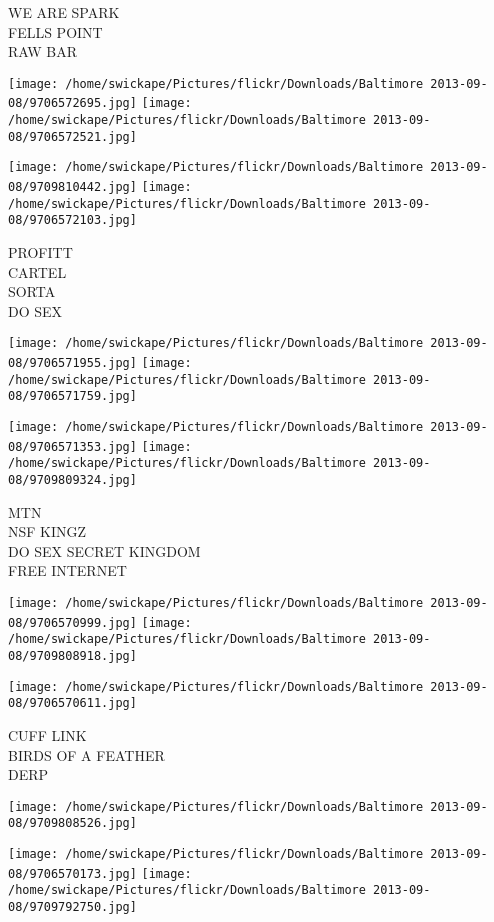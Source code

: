 \documentclass[10pt,letterpaper]{article}
\begin{document}
WE ARE SPARK\\
FELLS POINT\\
RAW BAR
\pagebreak

\texttt{[image: /home/swickape/Pictures/flickr/Downloads/Baltimore 2013-09-08/9706572695.jpg]}
\texttt{[image: /home/swickape/Pictures/flickr/Downloads/Baltimore 2013-09-08/9706572521.jpg]}

\texttt{[image: /home/swickape/Pictures/flickr/Downloads/Baltimore 2013-09-08/9709810442.jpg]}
\texttt{[image: /home/swickape/Pictures/flickr/Downloads/Baltimore 2013-09-08/9706572103.jpg]}

PROFITT\\
CARTEL\\
SORTA\\
DO SEX
\pagebreak

\texttt{[image: /home/swickape/Pictures/flickr/Downloads/Baltimore 2013-09-08/9706571955.jpg]}
\texttt{[image: /home/swickape/Pictures/flickr/Downloads/Baltimore 2013-09-08/9706571759.jpg]}

\texttt{[image: /home/swickape/Pictures/flickr/Downloads/Baltimore 2013-09-08/9706571353.jpg]}
\texttt{[image: /home/swickape/Pictures/flickr/Downloads/Baltimore 2013-09-08/9709809324.jpg]}

MTN\\
NSF KINGZ\\
DO SEX SECRET KINGDOM\\
FREE INTERNET
\pagebreak

\texttt{[image: /home/swickape/Pictures/flickr/Downloads/Baltimore 2013-09-08/9706570999.jpg]}
\texttt{[image: /home/swickape/Pictures/flickr/Downloads/Baltimore 2013-09-08/9709808918.jpg]}

\texttt{[image: /home/swickape/Pictures/flickr/Downloads/Baltimore 2013-09-08/9706570611.jpg]}

CUFF LINK\\
BIRDS OF A FEATHER\\
DERP
\pagebreak

\texttt{[image: /home/swickape/Pictures/flickr/Downloads/Baltimore 2013-09-08/9709808526.jpg]}

\vspace{0.25in}
\texttt{[image: /home/swickape/Pictures/flickr/Downloads/Baltimore 2013-09-08/9706570173.jpg]}
\texttt{[image: /home/swickape/Pictures/flickr/Downloads/Baltimore 2013-09-08/9709792750.jpg]}
\end{document}
